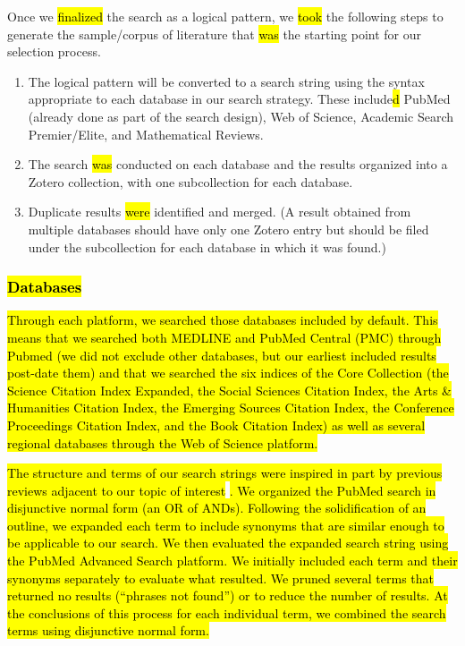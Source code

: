 \documentclass[sn-mathphys,Numbered,pdflatex]{sn-jnl}
\theoremstyle{remark}
\theoremstyle{definition}
\providecommand{\tightlist}{%
  \setlength{\itemsep}{0pt}\setlength{\parskip}{0pt}}
\begin{document}
Once we \hl{finalized} the search as a logical pattern, we \hl{took} the
following steps to generate the sample/corpus of literature that
\hl{was} the starting point for our selection process.

\begin{enumerate}
\def\labelenumi{\arabic{enumi}.}
\tightlist
\item
  The logical pattern will be converted to a search string using the
  syntax appropriate to each database in our search strategy. These
  include\hl{d} PubMed (already done as part of the search design), Web
  of Science, Academic Search Premier/Elite, and Mathematical Reviews.
\item
  The search \hl{was} conducted on each database and the results
  organized into a Zotero collection, with one subcollection for each
  database.
\item
  Duplicate results \hl{were} identified and merged. (A result obtained
  from multiple databases should have only one Zotero entry but should
  be filed under the subcollection for each database in which it was
  found.)
\end{enumerate}

\subsubsection{\texorpdfstring{\hl{Databases}}{}}\label{section-2}

\hl{Through each platform, we searched those databases included by default.
This means that we searched both MEDLINE and PubMed Central (PMC) through Pubmed (we did not exclude other databases, but our earliest included results post-date them) and that we searched the six indices of the Core Collection (the Science Citation Index Expanded, the Social Sciences Citation Index, the Arts \& Humanities Citation Index, the Emerging Sources Citation Index, the Conference Proceedings Citation Index, and the Book Citation Index) as well as several regional databases through the Web of Science platform.}

\hl{The structure and terms of our search strings were inspired in part by previous reviews adjacent to our topic of interest }\citep{Sharafoddini2017, Parimbelli2018}\hl{. We organized the PubMed search in disjunctive normal form (an OR of ANDs). Following the solidification of an outline, we expanded each term to include synonyms that are similar enough to be applicable to our search. We then evaluated the expanded search string using the PubMed Advanced Search platform. We initially included each term and their synonyms separately to evaluate what resulted. We pruned several terms that returned no results (``phrases not found'') or to reduce the number of results. At the conclusions of this process for each individual term, we combined the search terms using disjunctive normal form.}
\end{document}

